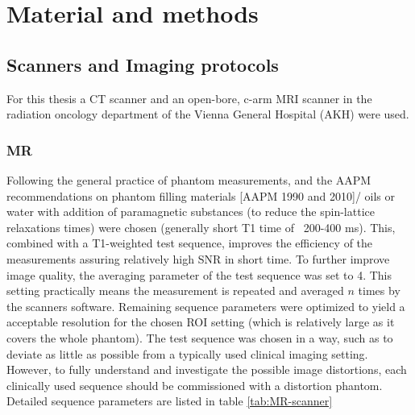 

\chapter{Material and methods}


\section{Scanners and Imaging protocols}

For this thesis a CT scanner and an open-bore, c-arm MRI scanner in the radiation oncology department of the Vienna General Hospital (AKH) were used.

\subsection{MR}

Following the general practice of phantom measurements, and the AAPM recommendations on phantom filling materials [AAPM 1990 and 2010]/ \cite{Jackson2009} oils or water with addition of paramagnetic substances (to reduce the spin-lattice relaxations times) were chosen (generally short T1 time of ~200-400 ms).
This, combined with a T1-weighted test sequence, improves the efficiency of the measurements assuring relatively high SNR in short time.
To further improve image quality, the averaging parameter of the test sequence was set to 4.
This setting practically means the measurement is repeated and averaged $n$ times by the scanners software.
Remaining sequence parameters were optimized to yield a acceptable resolution for the chosen ROI setting (which is relatively large as it covers the whole phantom).
The test sequence was chosen in a way, such as to deviate as little as possible from a typically used clinical imaging setting.
However, to fully understand and investigate the possible image distortions, each clinically used sequence should be commissioned with a distortion phantom.
Detailed sequence parameters are listed in table \ref{tab:MR-scanner}


